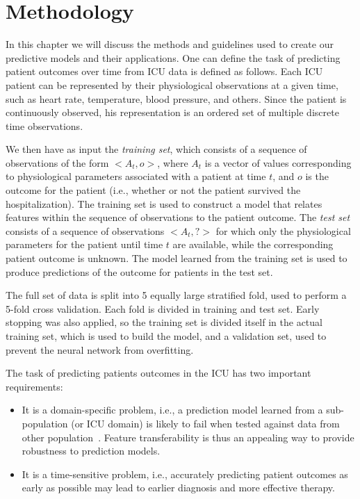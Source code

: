 \chapter{Methodology}
\label{chap:methodology}

In this chapter we will discuss the methods and guidelines used to create our predictive models and their applications. One can define the task of predicting patient outcomes over time from ICU data is defined as follows. Each ICU patient can be represented by their physiological observations at a given time, such as heart rate, temperature, blood pressure, and others. Since the patient is continuously observed, his representation is an ordered set of multiple discrete time observations.

We then have as input the {\em training set}, which consists of a sequence of observations of the form $<A_t,o>$, where $A_t$ is a vector of values corresponding to physiological parameters associated with a patient at time $t$, and $o$ is the outcome for the patient (i.e., whether or not the patient survived the hospitalization). The training set is used to construct a model that relates features within the sequence of observations to the patient outcome. The {\em test set} consists of a sequence of observations $<A_t,?>$ for which only the physiological parameters for the patient until time $t$ are available, while the corresponding patient outcome is unknown. The model learned from the training set is used to produce predictions of the outcome for patients in the test set. 

The full set of data is split into 5 equally large stratified fold, used to perform a 5-fold cross validation. Each fold is divided in training and test set. Early stopping \citep{prechelt1998automatic} was also applied, so the training set is divided itself in the actual training set, which is used to build the model, and a validation set, used to prevent the neural network from overfitting.

The task of predicting patients outcomes in the ICU has two important requirements:
\begin{itemize}
\item It is a domain-specific problem, i.e., a prediction model learned from a sub-population (or ICU domain) is likely to fail when tested against data from other population~\citep{longi}. Feature transferability is thus an appealing way to provide robustness to prediction models.
\item It is a time-sensitive problem, i.e., accurately predicting patient outcomes as early as possible may lead to earlier diagnosis and more effective therapy.
\end{itemize}

